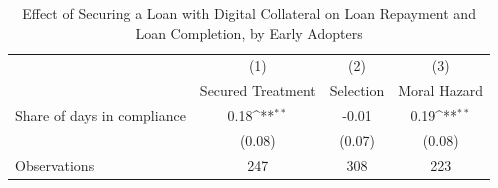 \begin{table}[htbp]\centering
\def\sym#1{\ifmmode^{#1}\else\(^{#1}\)\fi}
\caption{Effect of Securing a Loan with Digital Collateral on Loan Repayment and Loan Completion, by Early Adopters\label{LASMH\_complete\_earlyadopt\_LATE\_110}}
\begin{tabular}{l*{3}{c}}
\toprule
                    &\multicolumn{1}{c}{(1)}&\multicolumn{1}{c}{(2)}&\multicolumn{1}{c}{(3)}\\
                    &\multicolumn{1}{c}{Secured Treatment}&\multicolumn{1}{c}{Selection}&\multicolumn{1}{c}{Moral Hazard}\\
\midrule
Share of days in compliance&        0.18\sym{**} &       -0.01         &        0.19\sym{**} \\
                    &      (0.08)         &      (0.07)         &      (0.08)         \\
\midrule
Observations        &         247         &         308         &         223         \\
\bottomrule
\end{tabular}
\end{table}
